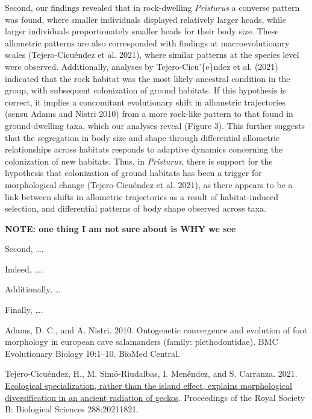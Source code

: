 \documentclass[
  11pt,
]{article}
\newlength{\cslhangindent}
\newlength{\cslentryspacingunit} %
\newenvironment{CSLReferences}[2] %
 {%
  \setlength{\parindent}{0pt}
  \ifodd #1
  \let\oldpar\par
  \def\par{\hangindent=\cslhangindent\oldpar}
  \fi
  \setlength{\parskip}{#2\cslentryspacingunit}
 }%
 {}
\begin{document}
Second, our findings revealed that in rock-dwelling \emph{Pristurus} a
converse pattern was found, where smaller individuals displayed
relatively larger heads, while larger individuals proportionately
smaller heads for their body size. These allometric patterns are also
corresponded with findings at macroevolutioanry scales (Tejero-Cicuéndez
et al. 2021), where similar patterns at the species level were observed.
Additionally, analyses by Tejero-Cicu'\{e\}ndez et al. (2021) indicated
that the rock habitat was the most likely ancestral condition in the
group, with subsequent colonization of ground habitats. If this
hypothesis is correct, it implies a concomitant evolutionary shift in
allometric trajectories (sensu Adams and Nistri 2010) from a more
rock-like pattern to that found in ground-dwelling taxa, which our
analyses reveal (Figure 3). This further suggests that the segregation
in body size and shape through differential allometric relationships
across habitats responds to adaptive dynamics concerning the
colonization of new habitats. Thus, in \emph{Pristurus}, there is
support for the hypothesis that colonization of ground habitats has been
a trigger for morphological change (Tejero-Cicuéndez et al. 2021), as
there appears to be a link between shifts in allometric trajectories as
a result of habitat-induced selection, and differential patterns of body
shape observed across taxa.

\textbf{NOTE: one thing I am not sure about is WHY we see }

Second, \ldots.

Indeed, \ldots.

Additionally, \ldots{}

Finally, \ldots.

\hypertarget{refs}{}
\begin{CSLReferences}{1}{0}
\leavevmode{}%
Adams, D. C., and A. Nistri. 2010. Ontogenetic convergence and evolution
of foot morphology in european cave salamanders (family:
plethodontidae). BMC Evolutionary Biology 10:1--10. BioMed Central.

\leavevmode{}%
Tejero-Cicuéndez, H., M. Simó-Riudalbas, I. Menéndez, and S. Carranza.
2021. \href{https://doi.org/10.1098/rspb.2021.1821}{Ecological
specialization, rather than the island effect, explains morphological
diversification in an ancient radiation of geckos}. Proceedings of the
Royal Society B: Biological Sciences 288:20211821.

\end{CSLReferences}
\end{document}
